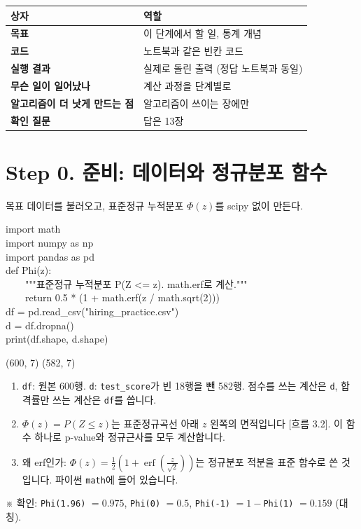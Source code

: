 \documentclass[11pt,a4paper]{article}
\newcommand{\code}[1]{\texttt{#1}}
\newcommand{\aside}[1]{{\footnotesize\color{black!65}#1}}
\newcommand{\Wc}[1]{{\scriptsize\textsf{\color{blue!60!black}[흐름 #1]}}}
\begin{document}
\begin{center}\small
\begin{tabular}{@{}l p{11cm}@{}}
\toprule
상자 & 역할 \\
\midrule
\textcolor{blue!45!black}{\textbf{목표}} & 이 단계에서 할 일, 통계 개념 \\
\textbf{코드} & 노트북과 같은 빈칸 코드 \\
\textcolor{green!35!black}{\textbf{실행 결과}} & 실제로 돌린 출력 (정답 노트북과 동일) \\
\textcolor{orange!60!black}{\textbf{무슨 일이 일어났나}} & 계산 과정을 단계별로 \\
\textcolor{red!50!black}{\textbf{알고리즘이 더 낫게 만드는 점}} & 알고리즘이 쓰이는 장에만 \\
\textbf{확인 질문} & 답은 13장 \\
\bottomrule
\end{tabular}
\end{center}

\setcounter{section}{-1}
\section{Step 0. 준비: 데이터와 정규분포 함수}
\begin{goalbox}{목표}
데이터를 불러오고, 표준정규 누적분포 $\Phi(z)$를 scipy 없이 만든다.
\end{goalbox}

\begin{codebox}
import math\\
import numpy as np\\
import pandas as pd\\[3pt]
def Phi(z):\\
\ \ \ \ """표준정규 누적분포 P(Z <= z). math.erf로 계산."""\\
\ \ \ \ return 0.5 * (1 + math.erf(z / math.sqrt(2)))\\[3pt]
df = pd.read\_csv("hiring\_practice.csv")\\
d = df.dropna()\\
print(df.shape, d.shape)
\end{codebox}
\begin{outbox}
(600, 7) (582, 7)
\end{outbox}

\begin{howbox}
\begin{enumerate}
\item \code{df}: 원본 600행. \code{d}: \code{test\_score}가 빈 18행을 뺀 582행. 점수를 쓰는 계산은 \code{d}, 합격률만 쓰는 계산은 \code{df}를 씁니다.
\item $\Phi(z)=P(Z\le z)$는 표준정규곡선 아래 $z$ 왼쪽의 면적입니다 \Wc{3.2}. 이 함수 하나로 p-value와 정규근사를 모두 계산합니다.
\item 왜 erf인가: $\Phi(z)=\frac12\left(1+\operatorname{erf}\!\left(\frac{z}{\sqrt2}\right)\right)$는 정규분포 적분을 표준 함수로 쓴 것입니다. 파이썬 \code{math}에 들어 있습니다.
\end{enumerate}
\end{howbox}
\aside{※ 확인: \code{Phi(1.96)} $=0.975$, \code{Phi(0)} $=0.5$, \code{Phi(-1)} $=1-$\code{Phi(1)} $=0.159$ (대칭).}
\end{document}
